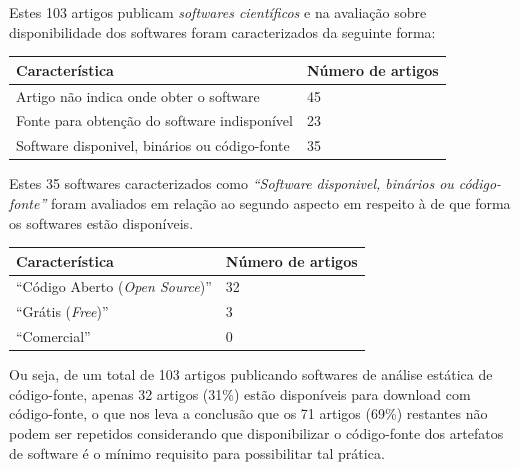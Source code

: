 Estes 103 artigos publicam {\it softwares científicos} e na avaliação sobre
disponibilidade dos softwares foram caracterizados da seguinte forma: %

\begin{table}[H]
\centering
\begin{tabular}{| l | l |}
  \hline
  {\bf Característica}                          & {\bf Número de artigos} \\
  \hline
  Artigo não indica onde obter o software       & 45 \\
  \hline
  Fonte para obtenção do software indisponível  & 23 \\
  \hline
  Software disponivel, binários ou código-fonte & 35 \\
  \hline
\end{tabular}
\end{table}

Estes 35 softwares caracterizados como {\it ``Software disponivel, binários ou
código-fonte''} foram avaliados em relação ao segundo aspecto em respeito à de
que forma os softwares estão disponíveis.

\begin{table}[H]
\centering
\begin{tabular}{| l | l |}
  \hline
  {\bf Característica}                          & {\bf Número de artigos} \\
  \hline
  ``Código Aberto ({\it Open Source})''         & 32 \\
  \hline
  ``Grátis ({\it Free})''                       & 3  \\
  \hline
  ``Comercial''                                 & 0  \\
  \hline
\end{tabular}
\end{table}


Ou seja, de um total de 103 artigos publicando softwares de análise estática de
código-fonte, apenas 32 artigos (31\%) estão disponíveis para download com
código-fonte, o que nos leva a conclusão que os 71 artigos (69\%) restantes não
podem ser repetidos considerando que disponibilizar o código-fonte dos
artefatos de software é o mínimo requisito para possibilitar tal prática.

